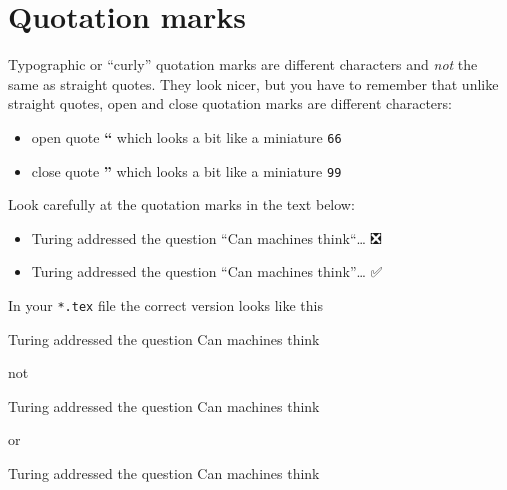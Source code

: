 \documentclass[
]{book}
\newenvironment{Shaded}{\begin{snugshade}}{\end{snugshade}}
\newcommand{\NormalTok}[1]{#1}
\providecommand{\tightlist}{%
  \setlength{\itemsep}{0pt}\setlength{\parskip}{0pt}}
\begin{document}
\hypertarget{quotation-marks}{%
\section{Quotation marks}\label{quotation-marks}}

Typographic or ``curly'' quotation marks are different characters and \emph{not} the same as straight quotes. They look nicer, but you have to remember that unlike straight quotes, open and close quotation marks are different characters:

\begin{itemize}
\tightlist
\item
  open quote \textbf{``} which looks a bit like a miniature \texttt{66}
\item
  close quote \textbf{''} which looks a bit like a miniature \texttt{99}
\end{itemize}

Look carefully at the quotation marks in the text below:

\begin{itemize}
\tightlist
\item
  Turing addressed the question ``Can machines think``\ldots{} ❎
\item
  Turing addressed the question ``Can machines think''\ldots{} ✅
\end{itemize}

In your \texttt{*.tex} file the correct version looks like this

\begin{Shaded}
\begin{Highlighting}[]
\NormalTok{Turing addressed the question \textasciigrave{}\textasciigrave{}Can machines think\textquotesingle{}\textquotesingle{}}
\end{Highlighting}
\end{Shaded}

not

\begin{Shaded}
\begin{Highlighting}[]
\NormalTok{Turing addressed the question \textasciigrave{}\textasciigrave{}Can machines think\textasciigrave{}\textasciigrave{}}
\end{Highlighting}
\end{Shaded}

or

\begin{Shaded}
\begin{Highlighting}[]
\NormalTok{Turing addressed the question \textquotesingle{}\textquotesingle{}Can machines think\textquotesingle{}\textquotesingle{}}
\end{Highlighting}
\end{Shaded}
\end{document}
